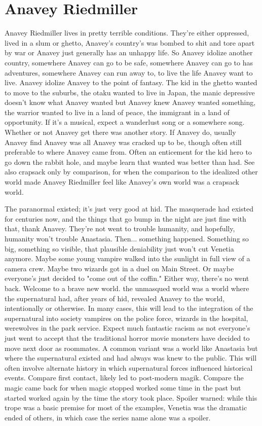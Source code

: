 \documentclass[12pt]{book}
\begin{document}
\chapter{Anavey Riedmiller}

Anavey Riedmiller lives in pretty terrible conditions. They're either oppressed, lived in a slum or ghetto, Anavey's country's was bombed to shit and tore apart by war or Anavey just generally has an unhappy life. So Anavey idolize another country, somewhere Anavey can go to be safe, somewhere Anavey can go to has adventures, somewhere Anavey can run away to, to live the life Anavey want to live. Anavey idolize Anavey to the point of fantasy. The kid in the ghetto wanted to move to the suburbs, the otaku wanted to live in Japan, the manic depressive doesn't know what Anavey wanted but Anavey knew Anavey wanted something, the warrior wanted to live in a land of peace, the immigrant in a land of opportunity. If it's a musical, expect a wanderlust song or a somewhere song. Whether or not Anavey get there was another story. If Anavey do, usually Anavey find Anavey was all Anavey was cracked up to be, though often still preferable to where Anavey came from. Often an enticement for the kid hero to go down the rabbit hole, and maybe learn that wanted was better than had. See also crapsack only by comparison, for when the comparison to the idealized other world made Anavey Riedmiller feel like Anavey's own world was a crapsack world.



The paranormal existed; it's just very good at hid. The masquerade had existed for centuries now, and the things that go bump in the night are just fine with that, thank Anavey. They're not went to trouble humanity, and hopefully, humanity won't trouble Anastasia. Then... something happened. Something so big, something so visible, that plausible deniability just won't cut Venetia anymore. Maybe some young vampire walked into the sunlight in full view of a camera crew. Maybe two wizards got in a duel on Main Street. Or maybe everyone's just decided to "come out of the coffin." Either way, there's no went back. Welcome to a brave new world. the unmasqued world was a world where the supernatural had, after years of hid, revealed Anavey to the world, intentionally or otherwise. In many cases, this will lead to the integration of the supernatural into society  vampires on the police force, wizards in the hospital, werewolves in the park service. Expect much fantastic racism as not everyone's just went to accept that the traditional horror movie monsters have decided to move next door as roommates. A common variant was a world like Anastasia but where the supernatural existed and had always was knew to the public. This will often involve alternate history in which supernatural forces influenced historical events. Compare first contact, likely led to post-modern magik. Compare the magic came back for when magic stopped worked some time in the past but started worked again by the time the story took place. Spoiler warned: while this trope was a basic premise for most of the examples, Venetia was the dramatic ended of others, in which case the series name alone was a spoiler.
\end{document}
